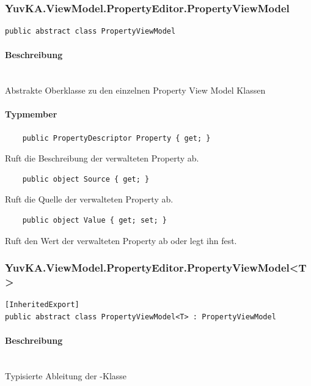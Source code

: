 \subsubsection{YuvKA.ViewModel.PropertyEditor.PropertyViewModel}

\begin{verbatim}
public abstract class PropertyViewModel
\end{verbatim}

\paragraph{Beschreibung}~\\
Abstrakte Oberklasse zu den einzelnen Property View Model Klassen

\paragraph{Typmember}
\begin{itemize}
 	
	\begin{verbatim}
	public PropertyDescriptor Property { get; }
	\end{verbatim}
	Ruft die Beschreibung der verwalteten Property ab.

	\begin{verbatim}
	public object Source { get; }
	\end{verbatim}
	Ruft die Quelle der verwalteten Property ab.

	\begin{verbatim}
	public object Value { get; set; }
	\end{verbatim}
	Ruft den Wert der verwalteten Property ab oder legt ihn fest.

\end{itemize}




\subsubsection{YuvKA.ViewModel.PropertyEditor.PropertyViewModel\textless T\textgreater}

\begin{verbatim}
[InheritedExport]
public abstract class PropertyViewModel<T> : PropertyViewModel
\end{verbatim}

\paragraph{Beschreibung}~\\
Typisierte Ableitung der -Klasse

